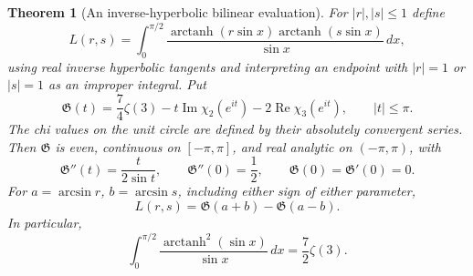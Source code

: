 \documentclass[11pt,a4paper]{article}
\numberwithin{equation}{section}
\newtheorem{theorem}{Theorem}[section]
\theoremstyle{definition}
\theoremstyle{remark}
\begin{document}
\begin{theorem}[An inverse-hyperbolic bilinear evaluation]
\label{xid:wat:thm:atanh}
For $|r|,|s|\leq1$ define
\[
 L(r,s)=\int_0^{\pi/2}
    \frac{\operatorname{arctanh}(r\sin x)
          \operatorname{arctanh}(s\sin x)}{\sin x}\,dx,
\]
using real inverse hyperbolic tangents and interpreting an endpoint
with $|r|=1$ or $|s|=1$ as an improper integral. Put
\begin{equation}\label{xid:wat:eq:Gclosed}
 \mathfrak G(t)=\frac74\zeta(3)
     -t\operatorname{Im}\chi_2(e^{it})
     -2\operatorname{Re}\chi_3(e^{it}),\qquad |t|\leq\pi.
\end{equation}
The chi values on the unit circle are defined by their absolutely
convergent series. Then $\mathfrak G$ is even, continuous on
$[-\pi,\pi]$, and real analytic on $(-\pi,\pi)$, with
\begin{equation}\label{xid:wat:eq:Gode}
 \mathfrak G''(t)=\frac{t}{2\sin t},\qquad
 \mathfrak G''(0)=\frac12,\qquad
 \mathfrak G(0)=\mathfrak G'(0)=0.
\end{equation}
For $a=\arcsin r$, $b=\arcsin s$, including either sign of either
parameter,
\begin{equation}\label{xid:wat:eq:atanhmain}
 \boxed{\displaystyle
 L(r,s)=\mathfrak G(a+b)-\mathfrak G(a-b).}
\end{equation}
In particular,
\begin{equation}\label{xid:wat:eq:atanh11}
 \boxed{\displaystyle
 \int_0^{\pi/2}\frac{\operatorname{arctanh}^2(\sin x)}{\sin x}\,dx
       =\frac72\zeta(3).}
\end{equation}
\end{theorem}
\end{document}
